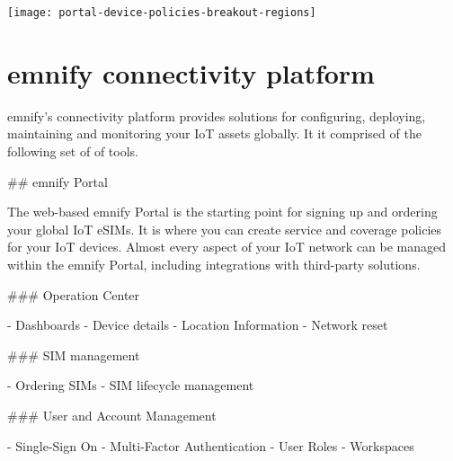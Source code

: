 \documentclass[11pt, oneside]{article}   	%
\newcommand{\addspace}{\vspace{2mm}}
\begin{document}
\begin{center}
  \addspace
  \texttt{[image: portal-device-policies-breakout-regions]}
\end{center}

\pagebreak[4]

\section{emnify connectivity platform}

\begin{markdown}

emnify's connectivity platform provides solutions for configuring, deploying, maintaining and monitoring your IoT assets globally.
It it comprised of the following set of of tools.

## emnify Portal

The web-based emnify Portal is the starting point for signing up and ordering your global IoT eSIMs.
It is where you can create service and coverage policies for your IoT devices.
Almost every aspect of your IoT network can be managed within the emnify Portal, including integrations with third-party solutions. 

### Operation Center
\end{markdown}
\addspace
\begin{markdown}
- Dashboards
- Device details
- Location Information
- Network reset
\end{markdown}
\addspace
\begin{markdown}
### SIM management
\end{markdown}
\addspace
\begin{markdown}
- Ordering SIMs
- SIM lifecycle management
\end{markdown}
\addspace
\begin{markdown}
### User and Account Management
\end{markdown}
\addspace
\begin{markdown}
- Single-Sign On
- Multi-Factor Authentication
- User Roles
- Workspaces
\end{markdown}
\addspace
\end{document}
